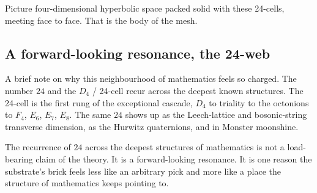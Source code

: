 Picture four-dimensional hyperbolic space packed solid with these 24-cells, meeting face to face. That is the body of the mesh.

\subsection{A forward-looking resonance, the 24-web}

A brief note on why this neighbourhood of mathematics feels so charged. The number $24$ and the $D_4$ / 24-cell recur across the deepest known structures. The 24-cell is the first rung of the exceptional cascade, $D_4$ to triality to the octonions to $F_4$, $E_6$, $E_7$, $E_8$. The same $24$ shows up as the Leech-lattice and bosonic-string transverse dimension, as the Hurwitz quaternions, and in Monster moonshine.

\begin{result}
The recurrence of $24$ across the deepest structures of mathematics is not a load-bearing claim of the theory. It is a forward-looking resonance. It is one reason the substrate's brick feels less like an arbitrary pick and more like a place the structure of mathematics keeps pointing to.
\end{result}
